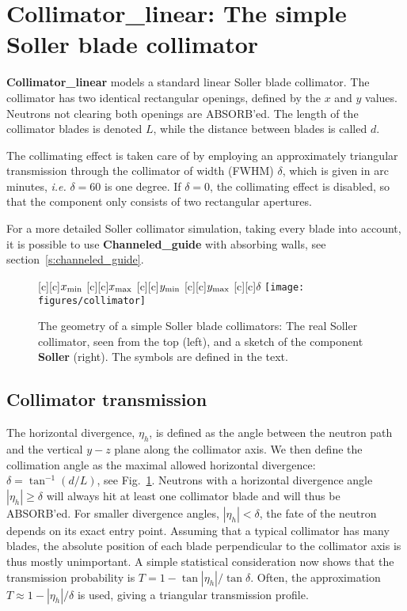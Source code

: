\section{Collimator\_linear: The simple Soller blade collimator}
\label{collimator-linear}


{\bf Collimator\_linear} models a standard linear Soller blade collimator.
The collimator has two identical rectangular openings,
defined by the $x$ and $y$ values. Neutrons not clearing both
openings are ABSORB'ed.
The length of the collimator blades is denoted $L$, while
the distance between blades is called $d$.

The collimating effect is taken care of by employing an approximately
triangular transmission through the collimator of width (FWHM) $\delta$, 
which is given in arc minutes, {\em i.e.} $\delta=60$ is one degree.
If $\delta=0$, the collimating effect is disabled,
so that the component only consists of two rectangular apertures.

For a more detailed Soller collimator simulation,
taking every blade into account, it is possible to use
{\bf Channeled\_guide} with absorbing walls, 
see section~\ref{s:channeled_guide}.

\begin{figure}[h!]
  \begin{center}
    [c][c]{$x_{\rm min}$}
    [c][c]{$x_{\rm max}$}
    [c][c]{$y_{\rm min}$}
    [c][c]{$y_{\rm max}$}
    [c][c]{$\delta$}
    \texttt{[image: figures/collimator]}
  \end{center}
\caption{The geometry of a simple Soller blade collimators:
The real Soller collimator, seen from the top (left),
and a sketch of the component {\bf Soller} (right).
The symbols are defined in the text.}
\label{f:collimator}
\end{figure}

\subsection{Collimator transmission}
The horizontal divergence, $\eta_h$, is defined as the angle between the
neutron path and the vertical $y-z$ plane along the collimator axis.
We then define the collimation angle as the maximal allowed
horizontal divergence: $\delta = \tan^{-1}(d/L)$,
see Fig.~\ref{f:collimator}. Neutrons with a horizontal
divergence angle $|\eta_h| \geq \delta$ will always
hit at least one collimator blade and will thus be ABSORB'ed.
For smaller divergence angles, $|\eta_h| < \delta$, the fate of the
neutron depends on its exact entry point.
Assuming that a typical collimator has many blades, the
absolute position of each blade perpendicular to the collimator axis
is thus mostly unimportant.
A simple statistical consideration now shows that the transmission
probability is $T = 1-\tan|\eta_h|/\tan\delta$.
Often, the approximation $T \approx 1-|\eta_h|/\delta$ is used, giving
a triangular transmission profile.

